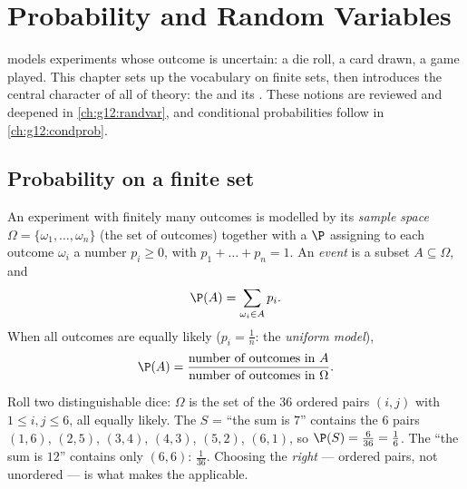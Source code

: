 \chapter{Probability and Random Variables}\label{ch:g11:prob}

 models experiments whose outcome is uncertain: a die roll, a
card drawn, a game played. This chapter sets up the vocabulary on finite
sets, then introduces the central character of all of  theory:
the \emph{} and its \emph{}. These notions are
reviewed and deepened in \cref{ch:g12:randvar}, and conditional
probabilities follow in \cref{ch:g12:condprob}.

\section{Probability on a finite set}

\begin{definition}\label{def:g11:prob:model}
An experiment with finitely many outcomes is modelled by its \emph{sample
space} $\Omega = \{\omega_1, \dots, \omega_n\}$ (the
set of outcomes) together with a \emph{} $\P$ assigning to each
outcome $\omega_i$ a number $p_i \geq 0$, with $p_1 + \dots + p_n = 1$. An
\emph{event} is a subset $A \subseteq \Omega$, and
\[
\P(A) = \sum_{\omega_i \in A} p_i .
\]
When all outcomes are equally likely ($p_i = \frac1n$: the \emph{uniform
model}),
\[
\P(A) = \frac{\text{number of outcomes in } A}
{\text{number of outcomes in } \Omega}.
\]
\end{definition}

\begin{example}\label{ex:g11:prob:twodice}
Roll two distinguishable dice: $\Omega$ is the set of the $36$ ordered pairs
$(i, j)$ with $1 \leq i, j \leq 6$, all equally likely. The 
$S$ = ``the sum is $7$'' contains the $6$ pairs
$(1,6)$, $(2,5)$, $(3,4)$, $(4,3)$, $(5,2)$, $(6,1)$, so
$\P(S) = \frac{6}{36} = \frac16$. The  ``the sum is $12$'' contains
only $(6,6)$:  $\frac{1}{36}$. Choosing the \emph{right}
 --- ordered pairs, not unordered --- is what makes the
 applicable.
\end{example}

